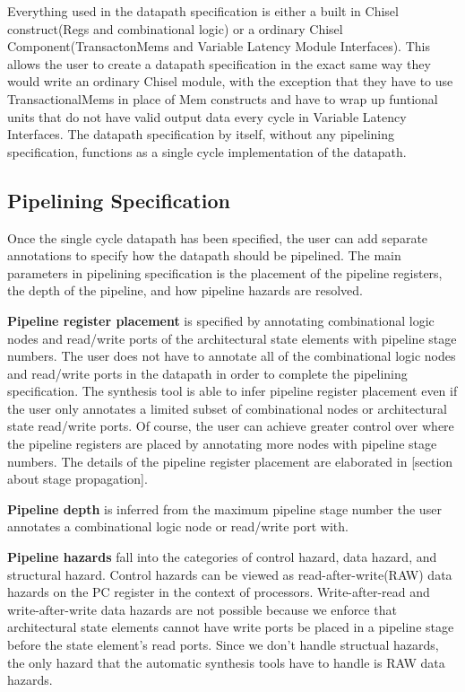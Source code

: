 Everything used in the datapath specification is either a built in Chisel construct(Regs and combinational logic) or a ordinary Chisel Component(TransactonMems and Variable Latency Module Interfaces). This allows the user to create a datapath specification in the exact same way they would write an ordinary Chisel module, with the exception that they have to use TransactionalMems in place of Mem constructs and have to wrap up funtional units that do not have valid output data every cycle in Variable Latency Interfaces. The datapath specification by itself, without any pipelining specification, functions as a single cycle implementation of the datapath.

\subsection {Pipelining Specification}
Once the single cycle datapath has been specified, the user can add separate annotations to specify how the datapath should be pipelined. The main parameters in pipelining specification is the placement of the pipeline registers, the depth of the pipeline, and how pipeline hazards are resolved.

{\bf Pipeline register placement} is specified by annotating combinational logic nodes and read/write ports of the architectural state elements with pipeline stage numbers. The user does not have to annotate all of the combinational logic nodes and read/write ports in the datapath in order to complete the pipelining specification. The synthesis tool is able to infer pipeline register placement even if the user only annotates a limited subset of combinational nodes or architectural state read/write ports. Of course, the user can achieve greater control over where the pipeline registers are placed by annotating more nodes with pipeline stage numbers. The details of the pipeline register placement are elaborated in [section about stage propagation]. 

{\bf Pipeline depth} is inferred from the maximum pipeline stage number the user annotates a combinational logic node or read/write port with. 

{\bf Pipeline hazards} fall into the categories of control hazard, data hazard, and structural hazard. Control hazards can be viewed as read-after-write(RAW) data hazards on the PC register in the context of processors. Write-after-read and write-after-write data hazards are not possible because we enforce that architectural state elements cannot have write ports be placed in a pipeline stage before the state element's read ports. Since we don't handle structual hazards, the only hazard that the automatic synthesis tools have to handle is RAW data hazards.

